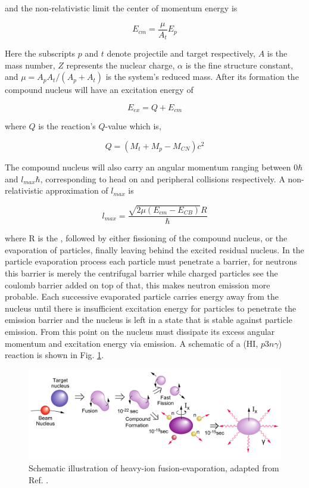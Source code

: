 and the non-relativistic limit the center of momentum energy is

\begin{equation}
\label{eqn:cmf_en}
E_{cm} = \frac{\mu}{A_{t}}E_{p}
\end{equation}

Here the subscripts $p$ and $t$ denote projectile and target respectively, $A$ is the mass number, $Z$ represents the nuclear charge, $\alpha{}$ is the fine structure constant, and $\mu = A_{p}A_{t}/(A_{p}+A_{t})$ is the system's reduced mass. After its formation the compound nucleus will have an excitation energy of

\begin{equation}
\label{eqn:cn_ex}
E_{ex} = Q + E_{cm}
\end{equation}

where $Q$ is the reaction's $Q$-value which is,

\begin{equation}
\label{eqn:cn_form_qvalue}
Q = (M_t+M_p-M_{CN})c^2
\end{equation}

The compound nucleus will also carry an angular momentum ranging between $0 \hbar$ and $l_{max} \hbar$, corresponding to head on and peripheral collisions respectively. A non-relativistic approximation of $l_{max}$ is

\begin{equation}
\label{eqn:cn_lmax}
l_{max} = \frac{\sqrt{2\mu(E_{cm}-E_{CB})}R}{\hbar}
\end{equation}

where R is the 
, followed by either fissioning of the compound nucleus, or the evaporation of particles, finally leaving behind the excited residual nucleus. In the particle evaporation process each particle must penetrate a barrier, for neutrons this barrier is merely the centrifugal barrier while charged particles see the coulomb barrier added on top of that, this makes neutron emission more probable. Each successive evaporated particle carries energy away from the nucleus until there is insufficient excitation energy for particles to penetrate the emission barrier and the nucleus is left in a state that is stable against particle emission. From this point on the nucleus must dissipate its excess angular momentum and excitation energy via \gr{} emission. A schematic of a (HI, $p3n\gamma{}$) reaction is shown in Fig. \ref{fig:chp3-fus-evap-schem}.
\begin{figure}
	\centerline{\includegraphics[width=\textwidth]{./img/c3/fusion_evaporation_horizontal.pdf}}
	\caption{Schematic illustration of heavy-ion fusion-evaporation, adapted from Ref. \cite{gsBooklet}.}
	\label{fig:chp3-fus-evap-schem}
\end{figure}

